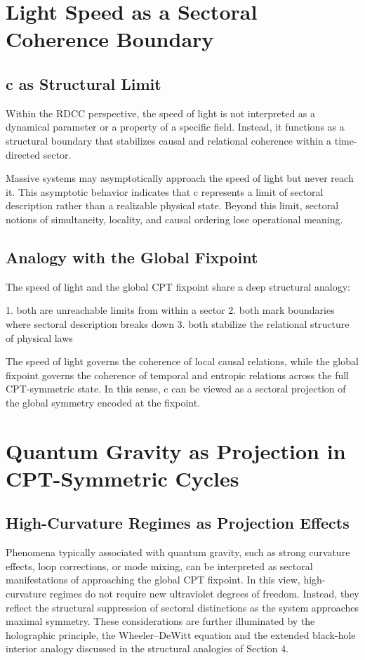 \documentclass[11pt,a4paper]{article}
\begin{document}
\section{Light Speed as a Sectoral Coherence Boundary}

\subsection{c as Structural Limit}

Within the RDCC perspective, the speed of light is not interpreted as a dynamical parameter or a property of a specific field. Instead, it functions as a structural boundary that stabilizes causal and relational coherence within a time-directed sector.

Massive systems may asymptotically approach the speed of light but never reach it. This asymptotic behavior indicates that c represents a limit of sectoral description rather than a realizable physical state. Beyond this limit, sectoral notions of simultaneity, locality, and causal ordering lose operational meaning.

\subsection{Analogy with the Global Fixpoint}

The speed of light and the global CPT fixpoint share a deep structural analogy:

1. both are unreachable limits from within a sector  
2. both mark boundaries where sectoral description breaks down  
3. both stabilize the relational structure of physical laws  

The speed of light governs the coherence of local causal relations, while the global fixpoint governs the coherence of temporal and entropic relations across the full CPT-symmetric state. In this sense, c can be viewed as a sectoral projection of the global symmetry encoded at the fixpoint.

\section{Quantum Gravity as Projection in CPT-Symmetric Cycles}

\subsection{High-Curvature Regimes as Projection Effects}

Phenomena typically associated with quantum gravity, such as strong curvature effects, loop corrections, or mode mixing, can be interpreted as sectoral manifestations of approaching the global CPT fixpoint. In this view, high-curvature regimes do not require new ultraviolet degrees of freedom. Instead, they reflect the structural suppression of sectoral distinctions as the system approaches maximal symmetry. These considerations are further illuminated by the holographic principle, the Wheeler--DeWitt equation and the extended black-hole interior analogy discussed in the structural analogies of Section 4.
\end{document}
